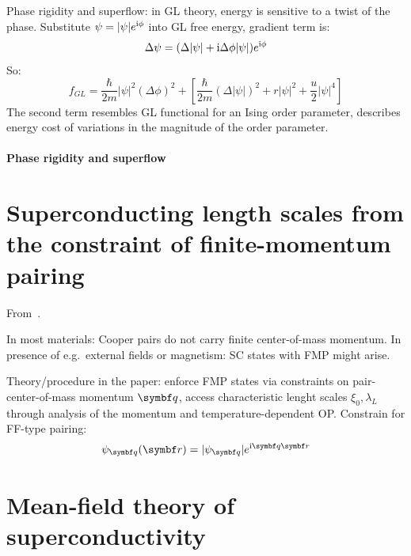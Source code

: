 \documentclass[../notes.tex]{subfiles}
\begin{document}
Phase rigidity and superflow: in GL theory, energy is sensitive to a twist of the phase.
Substitute \(\psi = \vert \psi \vert e^{\mathrm{i} \phi}\) into GL free energy, gradient term is:
\begin{equation}
	\Delta \psi = (\Delta \vert \psi \vert + \mathrm{i} \Delta \phi \vert \psi \vert) e^{\mathrm{i} \phi}
\end{equation}
So:
\begin{equation}
	f_{GL}  = \frac{\hbar}{2m} \vert \psi \vert^2 (\Delta \phi)^2 + \left[ \frac{\hbar}{2m} (\Delta \vert \psi \vert)^2 + r \vert \psi \vert^2 + \frac{u}{2} \vert \psi \vert^4 \right]
\end{equation}
The second term resembles GL functional for an Ising order parameter, describes energy cost of variations in the magnitude of the order parameter.

\paragraph{Phase rigidity and superflow}



\section{Superconducting length scales from the constraint of finite-momentum pairing}

From~\cite{wittBypassingLatticeBCSBEC2024}.

In most materials: Cooper pairs do not carry finite center-of-mass momentum.
In presence of e.g.\ external fields or magnetism: SC states with FMP might arise.

Theory/procedure in the paper: enforce FMP states via constraints on pair-center-of-mass momentum \(\vb{q}\), access characteristic lenght scales \(\xi_0, \lambda_L\) through analysis of the momentum and temperature-dependent OP\@.
Constrain for FF-type pairing:
\begin{equation}
	\psi_{\vb{q}} (\vb{r}) = \vert \psi_{\vb{q}} \vert e^{\iu \vb{q} \vb{r}}
\end{equation}


\section{Mean-field theory of superconductivity}\label{sec:bcs-theory}
\end{document}
